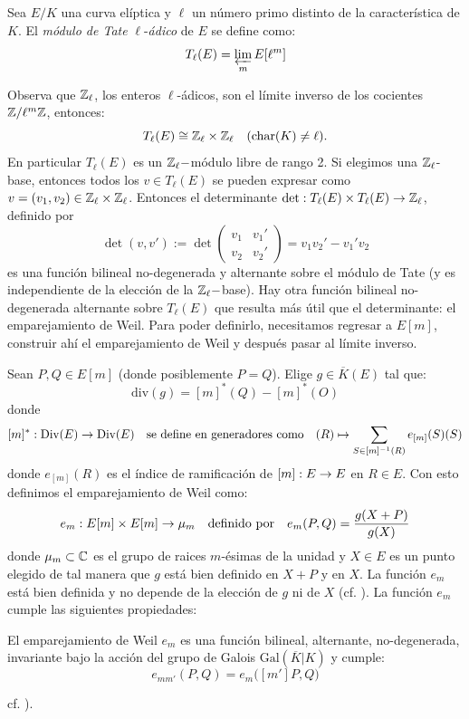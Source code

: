 \begin{defin}
  Sea $E/K$ una curva el\'iptica y $\ell$ un n\'umero primo distinto de la caracter\'istica de $K$.
  El \emph{m\'odulo de Tate} $\ell$-\emph{\'adico} de $E$ se define como:
  \[
    T_{\ell}(E)=\varprojlim_{m}E[\ell^m]
  \]
\end{defin}
Observa que $\mathbb{Z}_{\ell}$, los enteros $\ell$-\'adicos, son el l\'imite inverso de los cocientes
$\mathbb{Z}/\ell^m\mathbb{Z}$, entonces:
\[
  T_{\ell}(E)\cong \mathbb{Z}_{\ell}\times\mathbb{Z}_{\ell} \quad(\text{char}(K)\neq\ell).
\]
En particular $T_{\ell}(E)$ es un $\mathbb{Z}_{\ell}-$m\'odulo libre de rango 2. Si elegimos una
$\mathbb{Z}_{\ell}$-base, entonces todos los $v\in T_{\ell}(E)$ se pueden expresar como
$v=(v_1,v_2)\in\mathbb{Z}_{\ell}\times\mathbb{Z}_{\ell}$. Entonces el determinante
$\det:T_{\ell}(E)\times T_{\ell}(E)\rightarrow\mathbb{Z}_{\ell}$, definido por
\[
  \det(v,v'):=\det\begin{pmatrix}v_1&v_1'\\v_2&v_2'\end{pmatrix}=v_1v_2'-v_1'v_2
\]
es una funci\'on bilineal
no-degenerada y alternante sobre el m\'odulo de Tate (y es independiente de la elecci\'on de la
$\mathbb{Z}_{\ell}-$base). Hay otra funci\'on
bilineal no-degenerada alternante sobre $T_{\ell}(E)$ que resulta m\'as \'util que el determinante:
el emparejamiento de Weil. Para poder definirlo, necesitamos regresar a $E[m]$, construir ah\'i
el emparejamiento de Weil y despu\'es pasar al l\'imite inverso.

Sean $P,Q\in E[m]$ (donde posiblemente $P=Q$). Elige $g\in\overline{K}(E)$ tal que:
\[
  \mathrm{div}(g)=[m]^*(Q)-[m]^*(O)
\]
donde
\[
  [m]^*:\mathrm{Div}(E)\rightarrow\mathrm{Div}(E) \quad\text{se define en generadores como}\quad
  (R)\mapsto \sum_{S\in[m]^{-1}(R)}e_{[m]}(S)(S)
\]
donde $e_{[m]}(R)$ es el \'indice de ramificaci\'on de $[m]:E\rightarrow E$ en $R\in E$. Con esto definimos
el emparejamiento de Weil como:
\[
  e_m:E[m]\times E[m]\rightarrow \mu_m \quad\text{definido por} \quad e_m(P,Q)=\frac{g(X+P)}{g(X)}
\]
donde $\mu_m\subset\mathbb{C}$ es el grupo de raices $m$-\'esimas de la unidad y $X\in E$ es un punto
elegido de tal manera que $g$ est\'a bien definido en $X+P$ y en $X$. La funci\'on $e_m$ est\'a
bien definida y no depende de la elecci\'on de $g$ ni de $X$
(cf. \cite[cap\'itulo III, \S8]{SilvermanTAOEC}). La funci\'on $e_m$ cumple las siguientes
propiedades:

\begin{prop}
  El emparejamiento de Weil $e_m$ es una funci\'on bilineal, alternante, no-degenerada, invariante
  bajo la acci\'on del grupo de Galois $\mathrm{Gal}(\overline{K}|K)$ y cumple:
  \begin{equation}\label{eqn:weil_compatible}
    e_{mm'}(P,Q)=e_m\big([m']P,Q\big)
  \end{equation}
\end{prop}
\noindent cf. \cite[cap\'itulo III, proposici\'on 8.1]{SilvermanTAOEC}).

